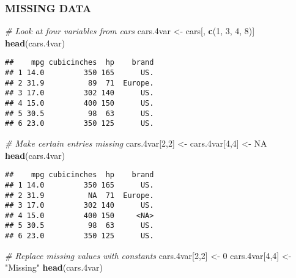 \documentclass[11pt,]{article}
\newenvironment{Shaded}{\begin{snugshade}}{\end{snugshade}}
\newcommand{\CommentTok}[1]{\textcolor[rgb]{0.56,0.35,0.01}{\textit{#1}}}
\newcommand{\DecValTok}[1]{\textcolor[rgb]{0.00,0.00,0.81}{#1}}
\newcommand{\FloatTok}[1]{\textcolor[rgb]{0.00,0.00,0.81}{#1}}
\newcommand{\KeywordTok}[1]{\textcolor[rgb]{0.13,0.29,0.53}{\textbf{#1}}}
\newcommand{\NormalTok}[1]{#1}
\newcommand{\OtherTok}[1]{\textcolor[rgb]{0.56,0.35,0.01}{#1}}
\newcommand{\StringTok}[1]{\textcolor[rgb]{0.31,0.60,0.02}{#1}}
\begin{document}
\hypertarget{missing-data}{%
\subsubsection{MISSING DATA}\label{missing-data}}

\begin{Shaded}
\begin{Highlighting}[]
  \CommentTok{# Look at four variables from cars}
\NormalTok{  cars}\FloatTok{.4}\NormalTok{var <-}\StringTok{ }\NormalTok{cars[, }\KeywordTok{c}\NormalTok{(}\DecValTok{1}\NormalTok{, }\DecValTok{3}\NormalTok{, }\DecValTok{4}\NormalTok{, }\DecValTok{8}\NormalTok{)]}
  \KeywordTok{head}\NormalTok{(cars}\FloatTok{.4}\NormalTok{var)}
\end{Highlighting}
\end{Shaded}

\begin{verbatim}
##    mpg cubicinches  hp    brand
## 1 14.0         350 165      US.
## 2 31.9          89  71  Europe.
## 3 17.0         302 140      US.
## 4 15.0         400 150      US.
## 5 30.5          98  63      US.
## 6 23.0         350 125      US.
\end{verbatim}

\begin{Shaded}
\begin{Highlighting}[]
  \CommentTok{# Make certain entries missing}
\NormalTok{  cars}\FloatTok{.4}\NormalTok{var[}\DecValTok{2}\NormalTok{,}\DecValTok{2}\NormalTok{] <-}\StringTok{ }\NormalTok{cars}\FloatTok{.4}\NormalTok{var[}\DecValTok{4}\NormalTok{,}\DecValTok{4}\NormalTok{] <-}\StringTok{ }\OtherTok{NA}
  \KeywordTok{head}\NormalTok{(cars}\FloatTok{.4}\NormalTok{var)}
\end{Highlighting}
\end{Shaded}

\begin{verbatim}
##    mpg cubicinches  hp    brand
## 1 14.0         350 165      US.
## 2 31.9          NA  71  Europe.
## 3 17.0         302 140      US.
## 4 15.0         400 150     <NA>
## 5 30.5          98  63      US.
## 6 23.0         350 125      US.
\end{verbatim}

\begin{Shaded}
\begin{Highlighting}[]
  \CommentTok{# Replace missing values with constants}
\NormalTok{  cars}\FloatTok{.4}\NormalTok{var[}\DecValTok{2}\NormalTok{,}\DecValTok{2}\NormalTok{] <-}\StringTok{ }\DecValTok{0}
\NormalTok{  cars}\FloatTok{.4}\NormalTok{var[}\DecValTok{4}\NormalTok{,}\DecValTok{4}\NormalTok{] <-}\StringTok{ "Missing"}
  \KeywordTok{head}\NormalTok{(cars}\FloatTok{.4}\NormalTok{var)}
\end{Highlighting}
\end{Shaded}
\end{document}
